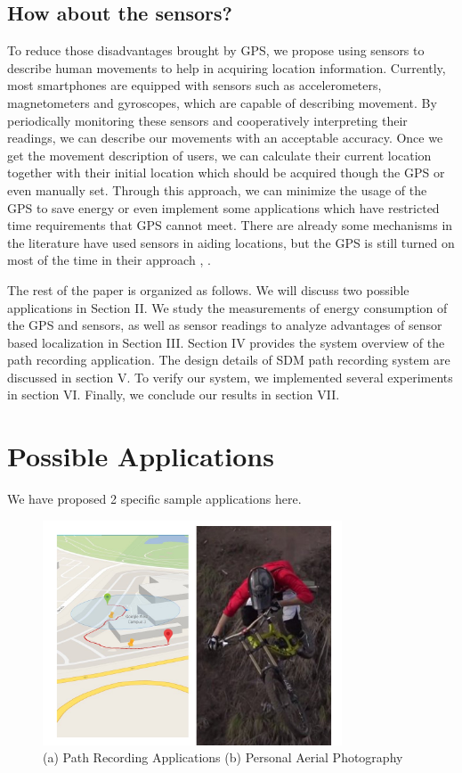 \documentclass[journal]{IEEEtran}
\begin{document}
\subsection{How about the sensors?}
To reduce those disadvantages brought by GPS, we propose using sensors to describe human movements to help in acquiring location information. 
Currently, most smartphones are equipped with sensors such as accelerometers, magnetometers and gyroscopes, which are capable of describing movement. 
By periodically monitoring these sensors and cooperatively interpreting their readings, we can describe our movements with an acceptable accuracy. 
Once we get the movement description of users, we can calculate their current location together with their initial location which should be acquired though the GPS or even manually set. 
Through this approach, we can minimize the usage of the GPS to save energy or even implement some applications which have restricted time requirements that GPS cannot meet. 
There are already some mechanisms in the literature have used sensors in aiding locations, but the GPS is still turned on most of the time in their approach \cite{Sensor Aug}, \cite{Track for Mobile}.

The rest of the paper is organized as follows.
We will discuss two possible applications in Section II.
We study the measurements of energy consumption of the GPS and sensors, as well as sensor readings to analyze advantages of sensor based localization in Section III.
Section IV provides the system overview of the path recording application.
The design details of SDM path recording system are discussed in section V.
To verify our system, we implemented several experiments in section VI.
Finally, we conclude our results in section VII.

\section{Possible Applications}
We have proposed 2 specific sample applications here.

\begin{figure}
	\centering
	\includegraphics[width=3.5in]{figures/pic}
	\caption{(a) Path Recording Applications	(b) Personal Aerial Photography}
\end{figure}
\end{document}
